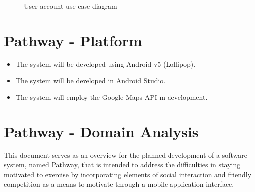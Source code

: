 \documentclass{article}
\begin{document}
\begin{figure}[H]
    \centering
    \begin{center}
    \end{center}
    \caption{User account use case diagram}
    \label{fig:my_label}
\end{figure}

\newpage

\section{Pathway - Platform}
\begin{itemize}
    \item The system will be developed using Android v5 (Lollipop).
    \item The system will be developed in Android Studio.
    \item The system will employ the Google Maps API in development.
\end{itemize}

\section{Pathway - Domain Analysis}
This document serves as an overview for the planned development of a software system, named Pathway, that is intended to address the difficulties in staying motivated to exercise by incorporating elements of social interaction and friendly competition as a means to motivate through a mobile application interface.
\end{document}
